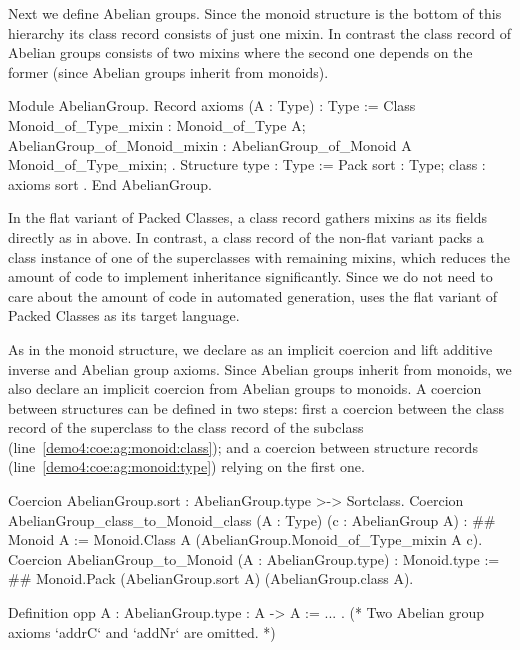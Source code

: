 \documentclass[a4paper,UKenglish,cleveref, autoref]{lipics-v2019}
\newcommand{\hb}{\coq{hierarchy-builder}}
\newcommand{\mixin}{mixin}
\newcommand{\mixins}{mixins}
\theoremstyle{implem}
\theoremstyle{implem}
\theoremstyle{command}
\theoremstyle{commands}
\begin{document}
Next we define Abelian groups.
Since the monoid structure is the bottom of this hierarchy its class record
 consists of just one \mixin{}. In contrast the class record
of Abelian groups consists of two \mixins{} where the second one depends
 on the former (since Abelian groups inherit from monoids).
\begin{coqcode}
Module AbelianGroup.
Record axioms (A : Type) : Type := Class {
  Monoid_of_Type_mixin : Monoid_of_Type A;
  AbelianGroup_of_Monoid_mixin : AbelianGroup_of_Monoid A Monoid_of_Type_mixin; }.
Structure type : Type := Pack { sort : Type; class : axioms sort }.
End AbelianGroup.
\end{coqcode}
In the flat variant of Packed Classes, a class record gathers mixins as its
fields directly as in above. In contrast, a class record of the non-flat variant
packs a class instance of one of the superclasses with remaining mixins, which
reduces the amount of code to implement inheritance significantly.
Since we do not need
to care about the amount of code in automated generation, \hb{} uses the flat
variant of Packed Classes as its target language.

As in the monoid structure, we declare  as an implicit
coercion and lift additive inverse  and Abelian group axioms.
Since Abelian groups inherit from monoids, we also declare an implicit coercion
from Abelian groups to monoids. A coercion between structures can be defined
in two steps: first a coercion between the class record of the
superclass to the class record of the subclass (line~\ref{demo4:coe:ag:monoid:class});
and a coercion between
structure records (line~\ref{demo4:coe:ag:monoid:type}) relying on the first one.
\begin{coqcode}
Coercion AbelianGroup.sort : AbelianGroup.type >-> Sortclass.
Coercion AbelianGroup_class_to_Monoid_class (A : Type) (c : AbelianGroup A) : #\label{demo4:coe:ag:monoid:class}#
  Monoid A := Monoid.Class A (AbelianGroup.Monoid_of_Type_mixin A c).
Coercion AbelianGroup_to_Monoid (A : AbelianGroup.type) : Monoid.type := #\label{demo4:coe:ag:monoid:type}#
  Monoid.Pack (AbelianGroup.sort A) (AbelianGroup.class A).

Definition opp {A : AbelianGroup.type} : A -> A := ... .
(* Two Abelian group axioms `addrC` and `addNr` are omitted. *)
\end{coqcode}
\end{document}
